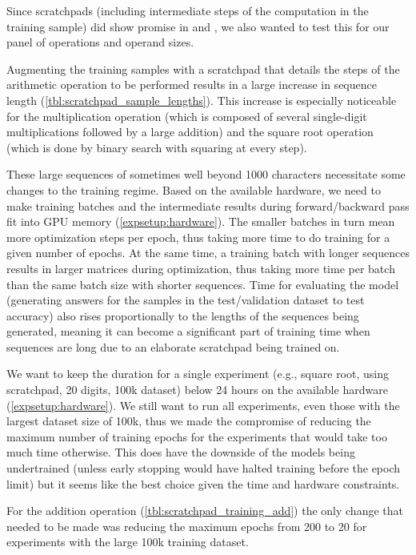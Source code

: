 Since scratchpads (including intermediate steps of the computation in the training sample) did show promise in \cite{teaching} and \cite{goat}, we also wanted to test this for our panel of operations and operand sizes.

Augmenting the training samples with a scratchpad that details the steps of the arithmetic operation to be performed results in a large increase in sequence length (\cref{tbl:scratchpad_sample_lengths}). This increase is especially noticeable for the multiplication operation (which is composed of several single-digit multiplications followed by a large addition) and the square root operation (which is done by binary search with squaring at every step).

These large sequences of sometimes well beyond 1000 characters necessitate some changes to the training regime. Based on the available hardware, we need to make training batches and the intermediate results during forward/backward pass fit into GPU memory (\cref{expsetup:hardware}). The smaller batches in turn mean more optimization steps per epoch, thus taking more time to do training for a given number of epochs. At the same time, a training batch with longer sequences results in larger matrices during optimization, thus taking more time per batch than the same batch size with shorter sequences.
Time for evaluating the model (generating answers for the samples in the test/validation dataset to test accuracy) also rises proportionally to the lengths of the sequences being generated, meaning it can become a significant part of training time when sequences are long due to an elaborate scratchpad being trained on.

We want to keep the duration for a single experiment (e.g., square root, using scratchpad, 20 digits, 100k dataset) below 24 hours on the available hardware (\cref{expsetup:hardware}).
We still want to run all experiments, even those with the largest dataset size of 100k, thus we made the compromise of reducing the maximum number of training epochs for the experiments that would take too much time otherwise. This does have the downside of the models being undertrained (unless early stopping would have halted training before the epoch limit) but it seems like the best choice given the time and hardware constraints.


For the addition operation (\cref{tbl:scratchpad_training_add}) the only change that needed to be made was reducing the maximum epochs from 200 to 20 for experiments with the large 100k training dataset.


